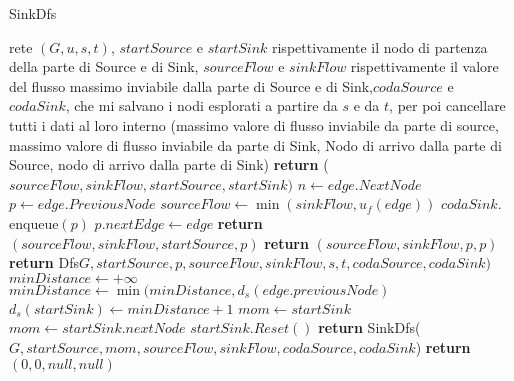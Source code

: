 \documentclass{article}
\begin{document}
\begin{algorithm}
    \caption{SinkDfs}
    \begin{algorithmic}
        \REQUIRE rete $(G,u,s,t)$, $startSource$ e $startSink$ rispettivamente il nodo di partenza della parte di Source e di Sink, $sourceFlow$ e $sinkFlow$ rispettivamente il valore del flusso massimo inviabile dalla parte di Source e di Sink,$codaSource$ e $codaSink$, che mi salvano i nodi esplorati a partire da $s$ e da $t$, per poi cancellare tutti i dati al loro interno
        \ENSURE (massimo valore di flusso inviabile da parte di source, massimo valore di flusso inviabile da parte di Sink, Nodo di arrivo dalla parte di Source, nodo di arrivo dalla parte di Sink)
        \STATE \textbf{return} ($sourceFlow,sinkFlow,startSource,startSink)$
            \ENDIF
            \STATE $n \leftarrow edge.NextNode$
            \STATE $p \leftarrow edge.PreviousNode$
            \STATE $sourceFlow \leftarrow \min(sinkFlow, u_f(edge))$
            \STATE $codaSink.$enqueue$(p)$
            \STATE $ p.nextEdge \leftarrow edge$ 
            \STATE \textbf{return} $(sourceFlow,sinkFlow,startSource,p)$
            \ENDIF
            \STATE \textbf{return}  $(sourceFlow, sinkFlow,p,p)$
            \ENDIF
            \STATE \textbf{return} Dfs$G,startSource, p, sourceFlow, sinkFlow,s,t,codaSource,codaSink)$
            \ENDIF
            \ENDFOR
            \STATE $minDistance \leftarrow +\infty$
            \STATE $minDistance \leftarrow \min(minDistance, d_s(edge.previousNode)$
            \ENDIF
            \ENDFOR
            \STATE $d_s(startSink) \leftarrow minDistance+1$
            \STATE $mom \leftarrow startSink$
            \ELSE
            \STATE $mom \leftarrow startSink.nextNode$
            \ENDIF
            \STATE $startSink.Reset()$
            \STATE \textbf{return} SinkDfs($G,startSource, mom, sourceFlow, sinkFlow,codaSource,codaSink$)
            \ENDIF
            \STATE \textbf{return} $(0,0,null,null)$

    \end{algorithmic}
\end{algorithm}
\end{document}
